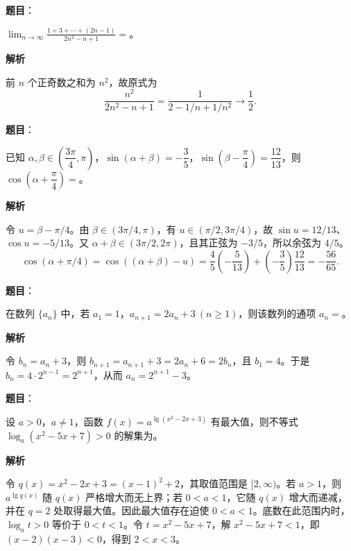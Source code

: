\begin{answer}

\textbf{题目}：

\(\displaystyle\lim_{n\to\infty}\frac{1+3+\cdots +(2n-1)}{2n^2-n+1}=\)\gkblank{}。

\textbf{解析}

前 \(n\) 个正奇数之和为 \(n^2\)，故原式为
\nopagebreak[4]
\[
\frac{n^2}{2n^2-n+1}=\frac1{2-1/n+1/n^2}\longrightarrow\frac12.
\]


\end{answer}
\begin{answer}

\textbf{题目}：

已知 \(\alpha,\beta\in\left(\dfrac{3\pi}{4},\pi\right)\)，\(\sin(\alpha+\beta)=-\dfrac35\)，\(\sin\left(\beta-\dfrac\pi4\right)=\dfrac{12}{13}\)，则 \(\cos\left(\alpha+\dfrac\pi4\right)=\)\gkblank{}。

\textbf{解析}

令 \(u=\beta-\pi/4\)。由 \(\beta\in(3\pi/4,\pi)\)，有 \(u\in(\pi/2,3\pi/4)\)，故 \(\sin u=12/13\)、\(\cos u=-5/13\)。又 \(\alpha+\beta\in(3\pi/2,2\pi)\)，且其正弦为 \(-3/5\)，所以余弦为 \(4/5\)。
\nopagebreak[4]
\[
\cos(\alpha+\pi/4)=\cos((\alpha+\beta)-u)
=\frac45\left(-\frac5{13}\right)+\left(-\frac35\right)\frac{12}{13}=-\frac{56}{65}.
\]


\end{answer}
\begin{answer}

\textbf{题目}：

在数列 \(\{a_n\}\) 中，若 \(a_1=1\)，\(a_{n+1}=2a_n+3\ (n\geq1)\)，则该数列的通项 \(a_n=\)\gkblank{}。

\textbf{解析}

令 \(b_n=a_n+3\)，则 \(b_{n+1}=a_{n+1}+3=2a_n+6=2b_n\)，且 \(b_1=4\)。于是 \(b_n=4\cdot2^{n-1}=2^{n+1}\)，从而 \(a_n=2^{n+1}-3\)。


\end{answer}
\begin{answer}

\textbf{题目}：

设 \(a>0\)，\(a\ne1\)，函数 \(f(x)=a^{\lg(x^2-2x+3)}\) 有最大值，则不等式 \(\log_a(x^2-5x+7)>0\) 的解集为\gkblank{}。

\textbf{解析}

令 \(q(x)=x^2-2x+3=(x-1)^2+2\)，其取值范围是 \([2,\infty)\)。若 \(a>1\)，则 \(a^{\lg q(x)}\) 随 \(q(x)\) 严格增大而无上界；若 \(0<a<1\)，它随 \(q(x)\) 增大而递减，并在 \(q=2\) 处取得最大值。因此最大值存在迫使 \(0<a<1\)。底数在此范围内时，\(\log_a t>0\) 等价于 \(0<t<1\)。令 \(t=x^2-5x+7\)，解 \(x^2-5x+7<1\)，即 \((x-2)(x-3)<0\)，得到 \(2<x<3\)。


\end{answer}
